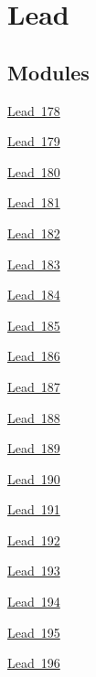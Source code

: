 \hypertarget{group___isotope_const-_lead}{}\section{Lead}
\label{group___isotope_const-_lead}
\subsection*{Modules}
\begin{DoxyCompactItemize}
\item 
\mbox{\hyperlink{group___isotope_const-_lead-_pb178}{Lead 178}}
\item 
\mbox{\hyperlink{group___isotope_const-_lead-_pb179}{Lead 179}}
\item 
\mbox{\hyperlink{group___isotope_const-_lead-_pb180}{Lead 180}}
\item 
\mbox{\hyperlink{group___isotope_const-_lead-_pb181}{Lead 181}}
\item 
\mbox{\hyperlink{group___isotope_const-_lead-_pb182}{Lead 182}}
\item 
\mbox{\hyperlink{group___isotope_const-_lead-_pb183}{Lead 183}}
\item 
\mbox{\hyperlink{group___isotope_const-_lead-_pb184}{Lead 184}}
\item 
\mbox{\hyperlink{group___isotope_const-_lead-_pb185}{Lead 185}}
\item 
\mbox{\hyperlink{group___isotope_const-_lead-_pb186}{Lead 186}}
\item 
\mbox{\hyperlink{group___isotope_const-_lead-_pb187}{Lead 187}}
\item 
\mbox{\hyperlink{group___isotope_const-_lead-_pb188}{Lead 188}}
\item 
\mbox{\hyperlink{group___isotope_const-_lead-_pb189}{Lead 189}}
\item 
\mbox{\hyperlink{group___isotope_const-_lead-_pb190}{Lead 190}}
\item 
\mbox{\hyperlink{group___isotope_const-_lead-_pb191}{Lead 191}}
\item 
\mbox{\hyperlink{group___isotope_const-_lead-_pb192}{Lead 192}}
\item 
\mbox{\hyperlink{group___isotope_const-_lead-_pb193}{Lead 193}}
\item 
\mbox{\hyperlink{group___isotope_const-_lead-_pb194}{Lead 194}}
\item 
\mbox{\hyperlink{group___isotope_const-_lead-_pb195}{Lead 195}}
\item 
\mbox{\hyperlink{group___isotope_const-_lead-_pb196}{Lead 196}}

\end{DoxyCompactItemize}
